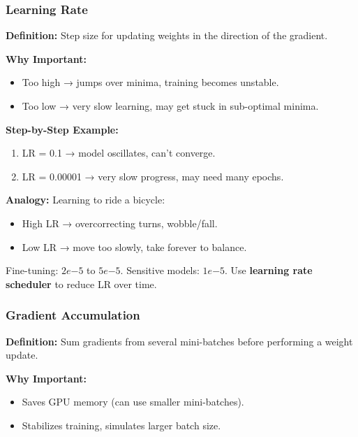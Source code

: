 \subsubsection{Learning Rate}
\textbf{Definition:} Step size for updating weights in the direction of the gradient.  

\textbf{Why Important:}  
\begin{itemize}
    \item Too high → jumps over minima, training becomes unstable.  
    \item Too low → very slow learning, may get stuck in sub-optimal minima.  
\end{itemize}

\textbf{Step-by-Step Example:}
\begin{enumerate}
    \item LR = 0.1 → model oscillates, can’t converge.  
    \item LR = 0.00001 → very slow progress, may need many epochs.  
\end{enumerate}

\textbf{Analogy:} Learning to ride a bicycle:  
\begin{itemize}
    \item High LR → overcorrecting turns, wobble/fall.  
    \item Low LR → move too slowly, take forever to balance.  
\end{itemize}

\begin{tcolorbox}[colback=blue!5,colframe=blue!70!black,title=Rule of Thumb]
Fine-tuning: $2e{-5}$ to $5e{-5}$.  
Sensitive models: $1e{-5}$.  
Use \textbf{learning rate scheduler} to reduce LR over time.
\end{tcolorbox}



\subsubsection{Gradient Accumulation}
\textbf{Definition:} Sum gradients from several mini-batches before performing a weight update.  

\textbf{Why Important:}  
\begin{itemize}
    \item Saves GPU memory (can use smaller mini-batches).  
    \item Stabilizes training, simulates larger batch size.  
\end{itemize}

